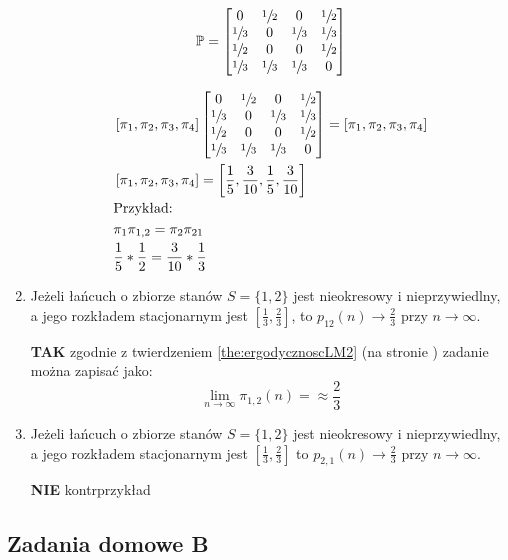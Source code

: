 \begin{enumerate}[label=\alph*)]
\begin{multicols}{2}
$$\mathbb{P}=\begin{bmatrix}
0&\sfrac{1}{2}&0&\sfrac{1}{2}\\
\sfrac{1}{3}&0&\sfrac{1}{3}&\sfrac{1}{3}\\
\sfrac{1}{2}&0&0&\sfrac{1}{2}\\
\sfrac{1}{3}&\sfrac{1}{3}&\sfrac{1}{3}&0
\end{bmatrix}$$
\end{multicols}
\begin{align*}
&\left[\pi_1, \pi_2, \pi_3, \pi_4\right]\begin{bmatrix}
0&\sfrac{1}{2}&0&\sfrac{1}{2}\\
\sfrac{1}{3}&0&\sfrac{1}{3}&\sfrac{1}{3}\\
\sfrac{1}{2}&0&0&\sfrac{1}{2}\\
\sfrac{1}{3}&\sfrac{1}{3}&\sfrac{1}{3}&0
\end{bmatrix} = \left[\pi_1, \pi_2, \pi_3, \pi_4\right]\\
&\left[\pi_1, \pi_2, \pi_3, \pi_4\right] = \left[\frac{1}{5},\frac{3}{10},\frac{1}{5},\frac{3}{10}\right]\\
&\text{Przykład: }\\
&\pi _1\pi_{1,2}=\pi_2\pi_{21}\\
&\frac{1}{5}*\frac{1}{2}=\frac{3}{10}*\frac{1}{3}
\end{align*}


\item Jeżeli łańcuch o zbiorze stanów $S = \{1, 2\}$ jest nieokresowy i nieprzywiedlny, a jego rozkładem stacjonarnym jest $\left[\frac{1}{3}, \frac{2}{3}\right]$, to $p_{12}(n) \rightarrow \frac{2}{3}$ przy $n \rightarrow \infty$.

\textbf{TAK} zgodnie z twierdzeniem \ref{the:ergodycznoscLM2} (na stronie \pageref{the:ergodycznoscLM2}) zadanie można zapisać jako:
$$\lim _{n\rightarrow \infty} \pi _{1,2}(n)=\approx\frac{2}{3}$$

\item  Jeżeli łańcuch o zbiorze stanów $S = \{1,2\}$ jest nieokresowy i nieprzywiedlny, a jego rozkładem stacjonarnym jest $\left[ \frac{1}{3},\frac{2}{3}\right]$ to $p_{2,1}(n)\to\frac{2}{3}$ przy $n\to\infty$.

\textbf{NIE} kontrprzykład
\end{enumerate}

\subsection{Zadania domowe B}
